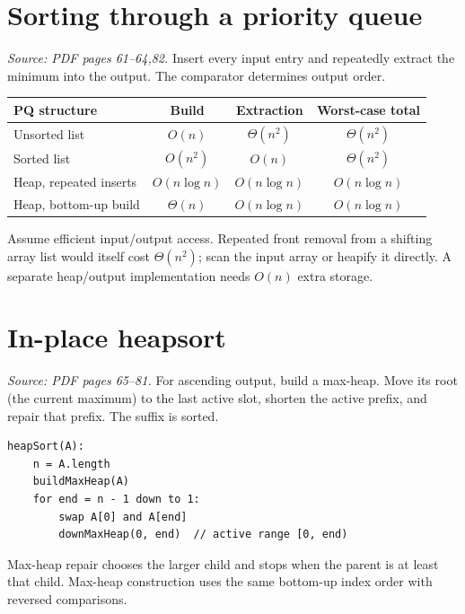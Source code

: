 \documentclass[11pt,letterpaper]{article}
\newcommand{\sourcepages}[1]{\textit{Source: PDF pages #1.}}
\begin{document}
\section{Sorting through a priority queue}
\sourcepages{61--64,82}
Insert every input entry and repeatedly extract the minimum into the output. The comparator determines output order.
\begin{center}\small\begin{tabular}{@{}lccc@{}}\toprule
PQ structure & Build & Extraction & Worst-case total\\\midrule
Unsorted list & $O(n)$ & $\Theta(n^2)$ & $\Theta(n^2)$\\
Sorted list & $O(n^2)$ & $O(n)$ & $\Theta(n^2)$\\
Heap, repeated inserts & $O(n\log n)$ & $O(n\log n)$ & $O(n\log n)$\\
Heap, bottom-up build & $\Theta(n)$ & $O(n\log n)$ & $O(n\log n)$\\\bottomrule
\end{tabular}\end{center}
Assume efficient input/output access. Repeated front removal from a shifting array list would itself cost $\Theta(n^2)$; scan the input array or heapify it directly. A separate heap/output implementation needs $O(n)$ extra storage.

\section{In-place heapsort}
\sourcepages{65--81}
For ascending output, build a max-heap. Move its root (the current maximum) to the last active slot, shorten the active prefix, and repair that prefix. The suffix is sorted.
\par\noindent\begin{minipage}{\linewidth}
\begin{lstlisting}
heapSort(A):
    n = A.length
    buildMaxHeap(A)
    for end = n - 1 down to 1:
        swap A[0] and A[end]
        downMaxHeap(0, end)  // active range [0, end)
\end{lstlisting}
\end{minipage}\par
Max-heap repair chooses the larger child and stops when the parent is at least that child. Max-heap construction uses the same bottom-up index order with reversed comparisons.
\end{document}
